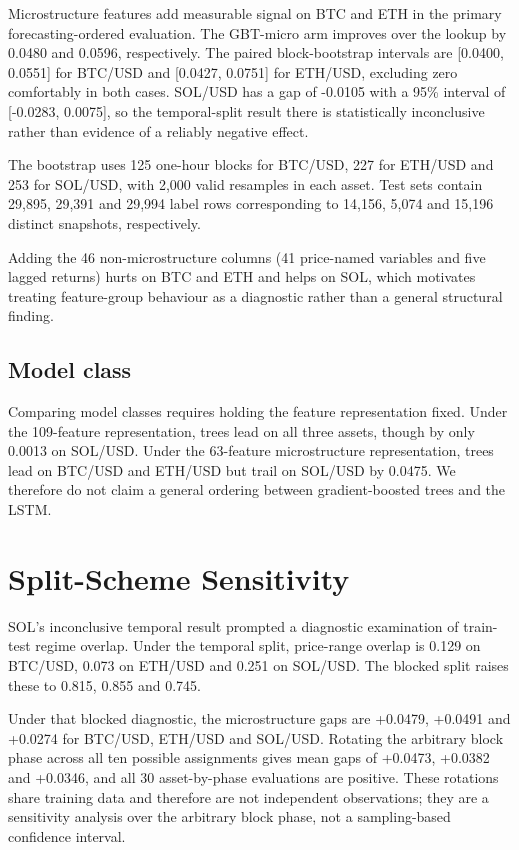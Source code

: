 \documentclass[11pt]{article}
\begin{document}
Microstructure features add measurable signal on BTC and ETH in the primary
forecasting-ordered evaluation. The GBT-micro arm improves over the lookup by
0.0480 and 0.0596, respectively. The paired block-bootstrap intervals are
[0.0400, 0.0551] for BTC/USD and [0.0427, 0.0751] for ETH/USD, excluding zero
comfortably in both cases. SOL/USD has a gap of -0.0105 with a 95\% interval of
[-0.0283, 0.0075], so the temporal-split result there is statistically
inconclusive rather than evidence of a reliably negative effect.

The bootstrap uses 125 one-hour blocks for BTC/USD, 227 for ETH/USD and 253 for
SOL/USD, with 2,000 valid resamples in each asset. Test sets contain 29,895,
29,391 and 29,994 label rows corresponding to 14,156, 5,074 and 15,196 distinct
snapshots, respectively.

Adding the 46 non-microstructure columns (41 price-named variables and five
lagged returns) hurts on BTC and ETH and helps on SOL, which motivates treating
feature-group behaviour as a diagnostic rather than a general structural
finding.

\subsection{Model class}
\label{sec:modelclass}

Comparing model classes requires holding the feature representation fixed.
Under the 109-feature representation, trees lead on all three assets, though by
only 0.0013 on SOL/USD. Under the 63-feature microstructure representation,
trees lead on BTC/USD and ETH/USD but trail on SOL/USD by 0.0475. We therefore
do not claim a general ordering between gradient-boosted trees and the LSTM.

\section{Split-Scheme Sensitivity}
\label{sec:regime}

SOL's inconclusive temporal result prompted a diagnostic examination of train-
test regime overlap. Under the temporal split, price-range overlap is 0.129 on
BTC/USD, 0.073 on ETH/USD and 0.251 on SOL/USD. The blocked split raises these
to 0.815, 0.855 and 0.745.

Under that blocked diagnostic, the microstructure gaps are +0.0479, +0.0491 and
+0.0274 for BTC/USD, ETH/USD and SOL/USD. Rotating the arbitrary block phase
across all ten possible assignments gives mean gaps of +0.0473, +0.0382 and
+0.0346, and all 30 asset-by-phase evaluations are positive. These rotations
share training data and therefore are not independent observations; they are a
sensitivity analysis over the arbitrary block phase, not a sampling-based
confidence interval.
\end{document}
